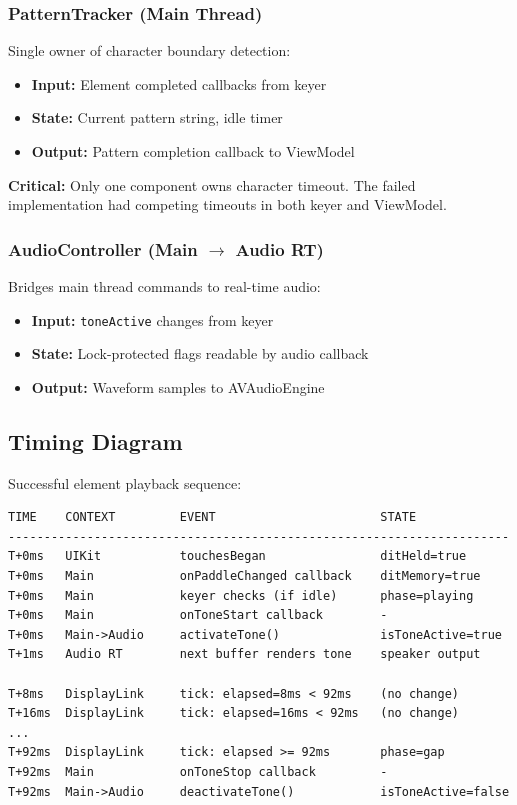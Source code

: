 \documentclass[a4paper,10pt,fleqn]{article}
\begin{document}
\subsubsection{PatternTracker (Main Thread)}

Single owner of character boundary detection:

\begin{itemize}
\item \textbf{Input:} Element completed callbacks from keyer
\item \textbf{State:} Current pattern string, idle timer
\item \textbf{Output:} Pattern completion callback to ViewModel
\end{itemize}

\textbf{Critical:} Only one component owns character timeout. The failed
implementation had competing timeouts in both keyer and ViewModel.

\subsubsection{AudioController (Main $\rightarrow$ Audio RT)}

Bridges main thread commands to real-time audio:

\begin{itemize}
\item \textbf{Input:} \texttt{toneActive} changes from keyer
\item \textbf{State:} Lock-protected flags readable by audio callback
\item \textbf{Output:} Waveform samples to AVAudioEngine
\end{itemize}

\subsection{Timing Diagram}

Successful element playback sequence:

\begin{verbatim}
TIME    CONTEXT         EVENT                       STATE
----------------------------------------------------------------------
T+0ms   UIKit           touchesBegan                ditHeld=true
T+0ms   Main            onPaddleChanged callback    ditMemory=true
T+0ms   Main            keyer checks (if idle)      phase=playing
T+0ms   Main            onToneStart callback        -
T+0ms   Main->Audio     activateTone()              isToneActive=true
T+1ms   Audio RT        next buffer renders tone    speaker output

T+8ms   DisplayLink     tick: elapsed=8ms < 92ms    (no change)
T+16ms  DisplayLink     tick: elapsed=16ms < 92ms   (no change)
...
T+92ms  DisplayLink     tick: elapsed >= 92ms       phase=gap
T+92ms  Main            onToneStop callback         -
T+92ms  Main->Audio     deactivateTone()            isToneActive=false
\end{verbatim}
\end{document}
